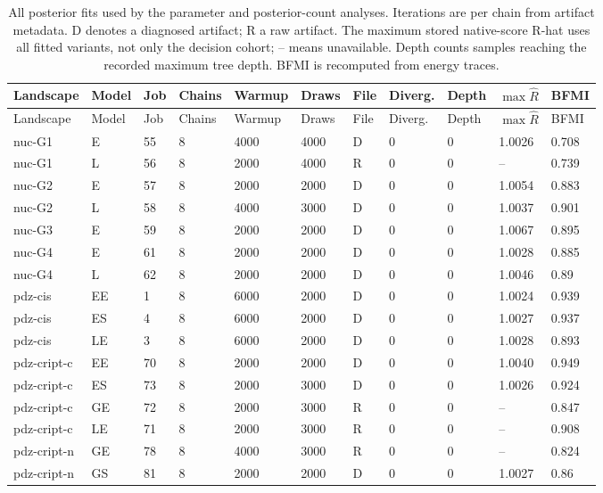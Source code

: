 \begingroup
\scriptsize
\setlength{\tabcolsep}{3pt}
\begin{longtable}[c]{lllllllllll}
\caption{All posterior fits used by the parameter and posterior-count analyses. Iterations are per chain from artifact metadata. D denotes a diagnosed artifact; R a raw artifact. The maximum stored native-score R-hat uses all fitted variants, not only the decision cohort; -- means unavailable. Depth counts samples reaching the recorded maximum tree depth. BFMI is recomputed from energy traces.}\label{tab:hmc-fits}\\
\toprule
Landscape & Model & Job & Chains & Warmup & Draws & File & Diverg. & Depth & $\max\hat R$ & BFMI \\
\midrule
\endfirsthead
\toprule
Landscape & Model & Job & Chains & Warmup & Draws & File & Diverg. & Depth & $\max\hat R$ & BFMI \\
\midrule
\endhead
\bottomrule
\endfoot
nuc-G1 & E & 55 & 8 & 4000 & 4000 & D & 0 & 0 & 1.0026 & 0.708 \\
nuc-G1 & L & 56 & 8 & 2000 & 4000 & R & 0 & 0 & -- & 0.739 \\
nuc-G2 & E & 57 & 8 & 2000 & 2000 & D & 0 & 0 & 1.0054 & 0.883 \\
nuc-G2 & L & 58 & 8 & 4000 & 3000 & D & 0 & 0 & 1.0037 & 0.901 \\
nuc-G3 & E & 59 & 8 & 2000 & 2000 & D & 0 & 0 & 1.0067 & 0.895 \\
nuc-G4 & E & 61 & 8 & 2000 & 2000 & D & 0 & 0 & 1.0028 & 0.885 \\
nuc-G4 & L & 62 & 8 & 2000 & 2000 & D & 0 & 0 & 1.0046 & 0.89 \\
pdz-cis & EE & 1 & 8 & 6000 & 2000 & D & 0 & 0 & 1.0024 & 0.939 \\
pdz-cis & ES & 4 & 8 & 6000 & 2000 & D & 0 & 0 & 1.0027 & 0.937 \\
pdz-cis & LE & 3 & 8 & 6000 & 2000 & D & 0 & 0 & 1.0028 & 0.893 \\
pdz-cript-c & EE & 70 & 8 & 2000 & 2000 & D & 0 & 0 & 1.0040 & 0.949 \\
pdz-cript-c & ES & 73 & 8 & 2000 & 3000 & D & 0 & 0 & 1.0026 & 0.924 \\
pdz-cript-c & GE & 72 & 8 & 2000 & 3000 & R & 0 & 0 & -- & 0.847 \\
pdz-cript-c & LE & 71 & 8 & 2000 & 3000 & R & 0 & 0 & -- & 0.908 \\
pdz-cript-n & GE & 78 & 8 & 4000 & 3000 & R & 0 & 0 & -- & 0.824 \\
pdz-cript-n & GS & 81 & 8 & 2000 & 2000 & D & 0 & 0 & 1.0027 & 0.86 \\

\end{longtable}

